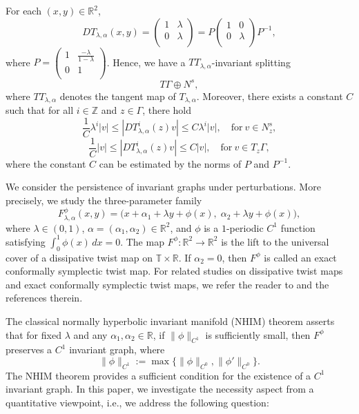\documentclass{amsart}
\newcommand{\Z}{\mathbb{Z}}
\newcommand{\R}{\mathbb{R}}
\newcommand{\la}{\lambda}
\newcommand{\al}{\alpha}
\begin{document}
	
	For each $(x,y)\in\R^2$,
	\[DT_{\la,\alpha}(x,y)=\left(
	\begin{array}{cc}
		1 & \la \\
		0 & \la \\
	\end{array}
	\right)=P\left(
	\begin{array}{cc}
		1 & 0 \\
		0 & \la \\
	\end{array}
	\right)P^{-1},
	\]
	where $P=\left(
	\begin{array}{cc}
		1 & \frac{-\la}{1-\la} \\
		0 & 1 \\
	\end{array}
	\right)$. Hence, we have a $TT_{\la,\al}$-invariant splitting
	\[T\Gamma\oplus N^s,\]
	where $TT_{\la,\al}$ denotes the tangent map of $T_{\la,\al}$.
	Moreover, there exists a constant $C$ such that for all $i\in\Z$ and $z\in \Gamma$, there hold
	\begin{equation}\label{hype}
		\frac{1}{C}\la^i|v|\leq |DT_{\la,\al}^i(z)v|\leq C\la^i|v|,\quad \mathrm{for}\ v\in N^s_z,
	\end{equation}
	\[\frac{1}{C}|v|\leq |DT^i_{\la,\al}(z)v|\leq C|v|,\quad \mathrm{for}\ v\in T_z\Gamma,\]
	where the constant $C$ can be estimated by the norms of $P$ and $P^{-1}$.
	
	We consider the persistence of invariant graphs under perturbations. More precisely, we study the three-parameter family
	\begin{equation}\label{Fp}
		F^\phi_{\lambda,\alpha}(x,y) = \big(x + \alpha_1 + \lambda y + \phi(x),\; \alpha_2 + \lambda y + \phi(x)\big),
	\end{equation}
	where \(\lambda\in(0,1)\), \(\alpha=(\alpha_1,\alpha_2)\in\mathbb{R}^2\), and \(\phi\) is a \(1\)-periodic \(C^1\) function satisfying \(\int_{0}^{1} \phi(x)\,dx = 0\).  The map \(F^\phi\colon\mathbb{R}^2\to\mathbb{R}^2\) is the lift to the universal cover of a dissipative twist map on \(\mathbb{T}\times\mathbb{R}\). If \(\alpha_2=0\), then \(F^\phi\) is called an exact conformally symplectic twist map. For related studies on dissipative twist maps and exact conformally symplectic twist maps, we refer the reader to \cite{Cas87,CCD13,CCD20,CCD22,Lec87,Mas23} and the references therein.
	
	The classical normally hyperbolic invariant manifold (NHIM) theorem asserts that for fixed \(\lambda\) and any \(\alpha_1,\alpha_2\in\mathbb{R}\), if \(\|\phi\|_{C^1}\) is sufficiently small, then \(F^\phi\) preserves a \(C^1\) invariant graph, where
	\[\|\phi\|_{C^1}:=\max\{\|\phi\|_{C^0},\|\phi'\|_{C^0}\}.\]
	The NHIM theorem provides a sufficient condition for the existence of a \(C^1\) invariant graph. In this paper, we investigate the necessity aspect from a quantitative viewpoint, i.e., we address the following question:
	
\end{document}
